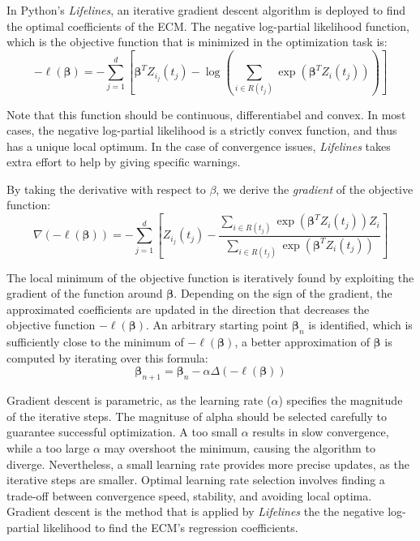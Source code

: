 In Python's \textit{Lifelines}, an iterative gradient descent algorithm is deployed to find the optimal coefficients of the ECM. The negative log-partial likelihood function, which is the objective function that is minimized in the optimization task is: 
$$-\ell(\boldsymbol{\beta}) = - \sum_{j=1}^{d} \left[ \boldsymbol{\beta}^T Z_{i_j}(t_j) - \log\left(\sum_{i \in R(t_j)} \exp(\boldsymbol{\beta}^T Z_{i}(t_j))\right) \right]$$ %

Note that this function should be continuous, differentiabel and convex. In most cases, the negative log-partial likelihood is a strictly convex function, and thus has a unique local optimum. In the case of convergence issues, \textit{Lifelines} takes extra effort to help by giving specific warnings. 

By taking the derivative with respect to $\beta$, we derive the \textit{gradient} of the objective function:
$$ \nabla (-\ell(\boldsymbol{\beta})) = - \sum_{j=1}^{d} \left[Z_{i_j}(t_j) - \frac{\sum_{i \in R(t_j)} \exp(\boldsymbol{\beta}^T Z_{i}(t_j))Z_{i}}{\sum_{i \in R(t_j)} \exp(\boldsymbol{\beta}^T Z_{i}(t_j))} \right]$$

The local minimum of the objective function is iteratively found by exploiting the gradient of the function around $\boldsymbol{\beta}$. Depending on the sign of the gradient, the approximated coefficients are updated in the direction that decreases the objective function $-\ell(\boldsymbol{\beta})$. An arbitrary starting point $\boldsymbol{\beta}_n$ is identified, which is sufficiently close to the minimum of $-\ell(\boldsymbol{\beta})$, a better approximation of $\boldsymbol{\beta}$ is computed by iterating over this formula: 
$$\boldsymbol{\beta}_{n+1} = \boldsymbol{\beta}_n - \alpha \Delta (-\ell(\boldsymbol{\beta}))$$

Gradient descent is parametric, as the learning rate ($\alpha$) specifies the magnitude of the iterative steps. The magnituse of alpha should be selected carefully to guarantee successful optimization. A too small $\alpha$ results in slow convergence, while a too large $\alpha$ may overshoot the minimum, causing the algorithm to diverge. Nevertheless, a small learning rate provides more precise updates, as the iterative steps are smaller. Optimal learning rate selection involves finding a trade-off between convergence speed, stability, and avoiding local optima.
Gradient descent is the method that is applied by \textit{Lifelines} the the negative log-partial likelihood to find the ECM's regression coefficients. %


